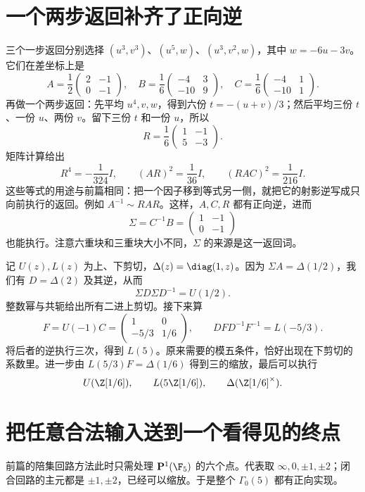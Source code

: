 \section{一个两步返回补齐了正向逆}
三个一步返回分别选择 $(u^3,v^3)$、$(u^5,w)$、$(u^3,v^2,w)$，其中 $w=-6u-3v$。它们在差坐标上是
\[
A=\frac12\begin{pmatrix}2&-1\\0&-1\end{pmatrix},\quad
B=\frac16\begin{pmatrix}-4&3\\-10&9\end{pmatrix},\quad
C=\frac16\begin{pmatrix}-4&1\\-10&1\end{pmatrix}.
\]
再做一个两步返回：先平均 $u^4,v,w$，得到六份 $t=-(u+v)/3$；然后平均三份 $t$、一份 $u$、两份 $v$。留下三份 $t$ 和一份 $u$，所以
\[
R=\frac16\begin{pmatrix}1&-1\\5&-3\end{pmatrix}.
\]
矩阵计算给出
\[
R^4=-\frac1{324}I,\qquad(AR)^2=\frac1{36}I,
\qquad(RAC)^2=\frac1{216}I.
\]
这些等式的用途与前篇相同：把一个因子移到等式另一侧，就把它的射影逆写成只向前执行的返回。例如 $A^{-1}\sim RAR$。这样，$A,C,R$ 都有正向逆，进而
\[\Sigma=C^{-1}B=\begin{pmatrix}1&-1\\0&-1\end{pmatrix}
\]
也能执行。注意六重块和三重块大小不同，$\Sigma$ 的来源是这一返回词。

记 $U(z),L(z)$ 为上、下剪切，$\Delta(z)=\diag(1,z)$。因为 $\Sigma A=\Delta(1/2)$，我们有 $D=\Delta(2)$ 及其逆，从而
\[\Sigma D\Sigma D^{-1}=U(1/2).
\]
整数幂与共轭给出所有二进上剪切。接下来算
\[
F=U(-1)C=\begin{pmatrix}1&0\\-5/3&1/6\end{pmatrix},\qquad
DFD^{-1}F^{-1}=L(-5/3).
\]
将后者的逆执行三次，得到 $L(5)$。原来需要的模五条件，恰好出现在下剪切的系数里。进一步由 $L(5/3)F=\Delta(1/6)$ 得到三的缩放，最后可以执行
\[U(\Z[1/6]),\qquad L(5\Z[1/6]),\qquad
\Delta(\Z[1/6]^\times).
\]

\section{把任意合法输入送到一个看得见的终点}
前篇的陪集回路方法此时只需处理 $\mathbf P^1(\F_5)$ 的六个点。代表取 $\infty,0,\pm1,\pm2$；闭合回路的主元都是 $\pm1,\pm2$，已经可以缩放。于是整个 $\Gamma_0(5)$ 都有正向实现。

